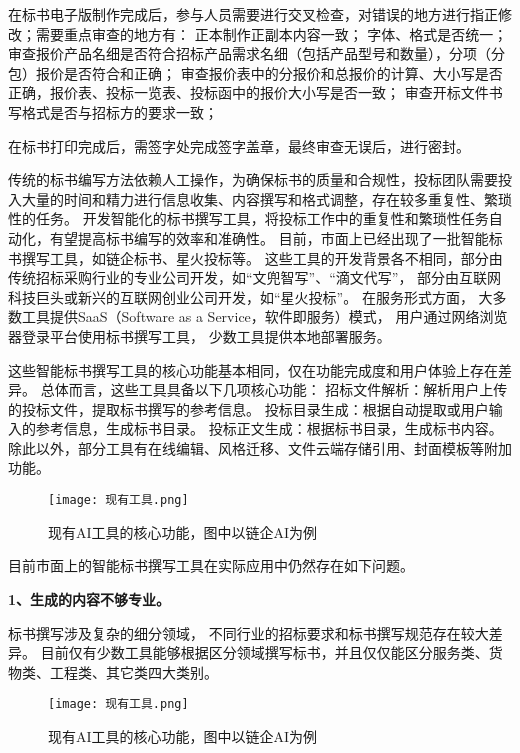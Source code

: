 \documentclass{xmu}
\begin{document}
在标书电子版制作完成后，参与人员需要进行交叉检查，对错误的地方进行指正修改；需要重点审查的地方有：
正本制作正副本内容一致；
字体、格式是否统一；
审查报价产品名细是否符合招标产品需求名细（包括产品型号和数量），分项（分包）报价是否符合和正确；
审查报价表中的分报价和总报价的计算、大小写是否正确，报价表、投标一览表、投标函中的报价大小写是否一致；
审查开标文件书写格式是否与招标方的要求一致；

在标书打印完成后，需签字处完成签字盖章，最终审查无误后，进行密封。

传统的标书编写方法依赖人工操作，为确保标书的质量和合规性，投标团队需要投入大量的时间和精力进行信息收集、内容撰写和格式调整，存在较多重复性、繁琐性的任务。
开发智能化的标书撰写工具，将投标工作中的重复性和繁琐性任务自动化，有望提高标书编写的效率和准确性。
目前，市面上已经出现了一批智能标书撰写工具，如链企标书、星火投标等。
这些工具的开发背景各不相同，部分由传统招标采购行业的专业公司开发，如“文兜智写”、“滴文代写”，
部分由互联网科技巨头或新兴的互联网创业公司开发，如“星火投标”。
在服务形式方面，
大多数工具提供SaaS（Software as a Service，软件即服务）模式，
用户通过网络浏览器登录平台使用标书撰写工具，
少数工具提供本地部署服务。

这些智能标书撰写工具的核心功能基本相同，仅在功能完成度和用户体验上存在差异。
总体而言，这些工具具备以下几项核心功能：
招标文件解析：解析用户上传的投标文件，提取标书撰写的参考信息。
投标目录生成：根据自动提取或用户输入的参考信息，生成标书目录。
投标正文生成：根据标书目录，生成标书内容。
除此以外，部分工具有在线编辑、风格迁移、文件云端存储引用、封面模板等附加功能。

\begin{figure}[!htb]
    \centering
    \texttt{[image: 现有工具.png]}\\
    \caption{现有AI工具的核心功能，图中以链企AI为例}\label{xmulogo}
\end{figure}

目前市面上的智能标书撰写工具在实际应用中仍然存在如下问题。

{\bf 1、生成的内容不够专业。}

标书撰写涉及复杂的细分领域，
不同行业的招标要求和标书撰写规范存在较大差异。
目前仅有少数工具能够根据区分领域撰写标书，并且仅仅能区分服务类、货物类、工程类、其它类四大类别。

\begin{figure}[!htb]
    \centering
    \texttt{[image: 现有工具.png]}\\
    \caption{现有AI工具的核心功能，图中以链企AI为例}\label{内容区分}
\end{figure}
\end{document}
